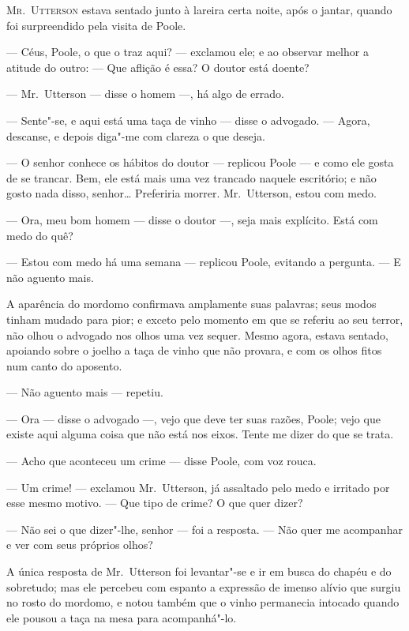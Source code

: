 \textsc{Mr.~Utterson} estava sentado junto à lareira certa noite, após o jantar,
quando foi surpreendido pela visita de Poole.

--- Céus, Poole, o que o traz aqui? --- exclamou ele; e ao observar melhor
a atitude do outro: --- Que aflição é essa? O doutor está doente?

--- Mr.~Utterson --- disse o homem ---, há algo de errado.

--- Sente"-se, e aqui está uma taça de vinho --- disse o advogado. --- Agora,
descanse, e depois diga"-me com clareza o que deseja.

--- O senhor conhece os hábitos do doutor --- replicou Poole --- e como ele
gosta de se trancar.  Bem, ele está mais uma vez trancado naquele
escritório; e não gosto nada disso, senhor\ldots{}  Preferiria morrer.  
Mr.~Utterson, estou com medo.

--- Ora, meu bom homem ---  disse o doutor ---, seja mais explícito.  Está
com medo do quê?

--- Estou com medo há uma semana --- replicou Poole, evitando a pergunta.
--- E não aguento mais.

A aparência do mordomo confirmava amplamente suas palavras; seus modos
tinham mudado para pior; e exceto pelo momento em que se referiu ao seu
terror, não olhou o advogado nos olhos uma vez sequer.  Mesmo agora,
estava sentado, apoiando sobre o joelho a taça de vinho que não
provara, e com os olhos fitos num canto do aposento.

--- Não aguento mais --- repetiu.

--- Ora --- disse o advogado ---, vejo que deve ter suas razões, Poole;
vejo que existe aqui alguma coisa que não está nos eixos.  Tente me
dizer do que se trata.

--- Acho que aconteceu um crime --- disse Poole, com voz rouca.

--- Um crime! --- exclamou Mr.~Utterson, já assaltado pelo medo e irritado
por esse mesmo motivo. --- Que tipo de crime?  O que quer dizer?

--- Não sei o que dizer"-lhe, senhor --- foi a resposta. --- Não quer me
acompanhar e ver com seus próprios olhos?

A única resposta de Mr.~Utterson foi levantar"-se e ir em busca do chapéu
e do sobretudo; mas ele percebeu com espanto a expressão de imenso
alívio que surgiu no rosto do mordomo, e notou também que o vinho
permanecia intocado quando ele pousou a taça na mesa para acompanhá"-lo.

